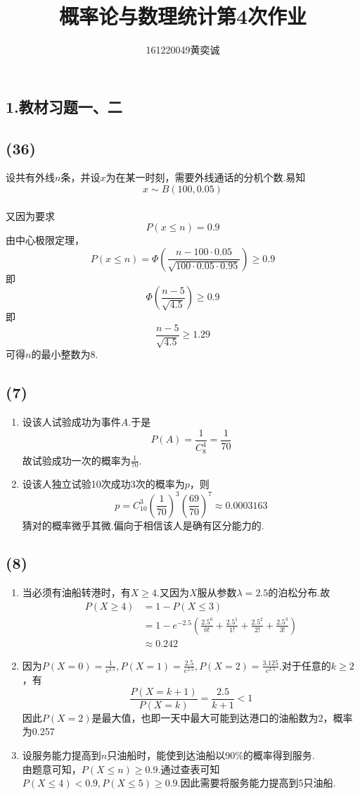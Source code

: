 \documentclass[twocolumn]{article}
\begin{document}
	\begin{CJK}{UTF8}{gbsn}		
			\title{概率论与数理统计第4次作业}
			\author{161220049\quad 黄奕诚}
			\maketitle
			
			\section*{1.教材习题一、二}
			\subsection*{(36)}
				设共有外线$n$条，并设$x$为在某一时刻，需要外线通话的分机个数.易知\[x\sim B(100,0.05)\]\\
				又因为要求\[P(x\le n)=0.9\]由中心极限定理，\[P(x\le n)=\Phi(\frac{n-100\cdot0.05}{\sqrt{100\cdot0.05\cdot0.95}})\ge0.9\]即\[\Phi(\frac{n-5}{\sqrt{4.5}})\ge0.9\]即\[\frac{n-5}{\sqrt{4.5}}\ge1.29\]可得$n$的最小整数为8.
			\subsection*{(7)}
				\begin{enumerate}[(1)]
					\item 设该人试验成功为事件$A$.于是\[P(A)=\frac{1}{C_8^4}=\frac{1}{70}\]故试验成功一次的概率为$\frac{1}{70}$.
					\item 设该人独立试验10次成功3次的概率为$p$，则\[p=C_{10}^3(\frac{1}{70})^3(\frac{69}{70})^7\approx0.0003163\]
					猜对的概率微乎其微.偏向于相信该人是确有区分能力的.
				\end{enumerate}
			\subsection*{(8)}
				\begin{enumerate}[(1)]
					\item 当必须有油船转港时，有$X\ge4$.又因为$X$服从参数$\lambda=2.5$的泊松分布.故\begin{align*}
						P(X\ge4) & =1-P(X\le3) \\ & =1-e^{-2.5}(\frac{2.5^0}{0!}+\frac{2.5^1}{1!}+\frac{2.5^2}{2!}+\frac{2.5^3}{3!})\\&\approx0.242
					\end{align*}
					\item 因为$P(X=0)=\frac{1}{e^{2.5}},P(X=1)=\frac{2.5}{e^{2.5}},P(X=2)=\frac{3.125}{e^{2.5}}$.对于任意的$k\ge2$，有\[\frac{P(X=k+1)}{P(X=k)}=\frac{2.5}{k+1}<1\]因此$P(X=2)$是最大值，也即一天中最大可能到达港口的油船数为2，概率为0.257
					\item 设服务能力提高到$n$只油船时，能使到达油船以90\%的概率得到服务.\\
					由题意可知，$P(X\le n)\ge0.9.$通过查表可知$P(X\le4)<0.9,P(X\le5)\ge0.9$.因此需要将服务能力提高到5只油船.
				\end{enumerate}

\end{CJK}
\end{document}
